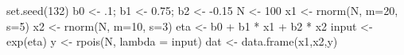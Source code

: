 \begin{Schunk}
\begin{Sinput}
 set.seed(132)
 b0 <- .1; b1 <- 0.75; b2 <- -0.15
 N <- 100
 x1 <- rnorm(N, m=20, s=5)
 x2 <- rnorm(N, m=10, s=3)
 eta <- b0 + b1 * x1 + b2 * x2
 input <- exp(eta)
 y <- rpois(N, lambda = input)
 dat <- data.frame(x1,x2,y)
\end{Sinput}
\end{Schunk}

